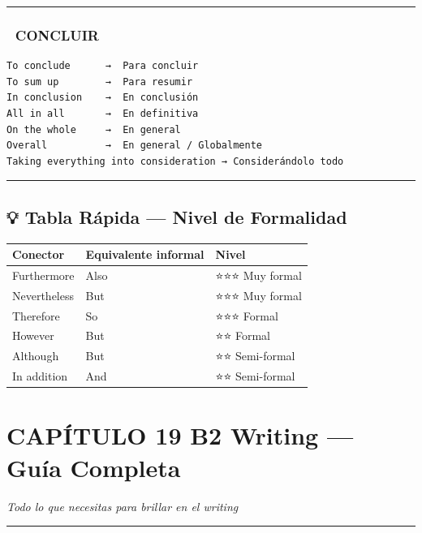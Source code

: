 \documentclass[
  spanish,
  letterpaper,
]{scrbook}
\begin{document}
\begin{center}\rule{0.5\linewidth}{0.5pt}\end{center}

\subsection{🏁 CONCLUIR}\label{concluir}

\begin{verbatim}
To conclude      →  Para concluir
To sum up        →  Para resumir
In conclusion    →  En conclusión
All in all       →  En definitiva
On the whole     →  En general
Overall          →  En general / Globalmente
Taking everything into consideration → Considerándolo todo
\end{verbatim}

\begin{center}\rule{0.5\linewidth}{0.5pt}\end{center}

\section{💡 Tabla Rápida --- Nivel de
Formalidad}\label{tabla-ruxe1pida-nivel-de-formalidad}

\begin{longtable}[]{@{}lll@{}}
\toprule\noalign{}
Conector & Equivalente informal & Nivel \\
\midrule\noalign{}
\endhead
\bottomrule\noalign{}
\endlastfoot
Furthermore & Also & ⭐⭐⭐ Muy formal \\
Nevertheless & But & ⭐⭐⭐ Muy formal \\
Therefore & So & ⭐⭐⭐ Formal \\
However & But & ⭐⭐ Formal \\
Although & But & ⭐⭐ Semi-formal \\
In addition & And & ⭐⭐ Semi-formal \\
\end{longtable}

\chapter{CAPÍTULO 19 B2 Writing --- Guía
Completa}\label{capuxedtulo-19-b2-writing-guuxeda-completa}

\emph{Todo lo que necesitas para brillar en el writing}

\begin{center}\rule{0.5\linewidth}{0.5pt}\end{center}
\end{document}
